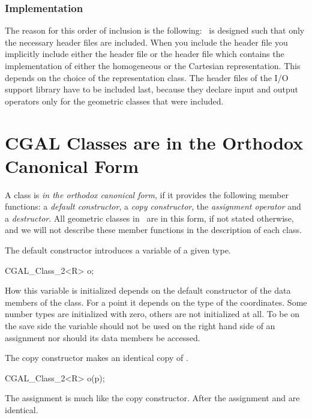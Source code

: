 \subsubsection*{Implementation}

The reason for this order of inclusion is the following: \cgal\ is designed
such that only the necessary header files are included. When you 
include the header file  you implicitly
include either the header file  or the header file
 which contains the implementation of either the 
homogeneous or the Cartesian representation. This depends on the choice
of the representation class. The header files of the I/O support library
have to be included last, because they declare input and output operators
only for the geometric classes that were included.


\section{CGAL Classes are in the Orthodox Canonical Form}

A class is {\em in the orthodox canonical form}, if it provides the
following member functions: a {\em default constructor}, a {\em copy
constructor}, the {\em assignment operator} and a {\em destructor}.
All geometric classes in \cgal\ are in this form, if not stated
otherwise, and we will 
not describe these member functions in the description of each class.

\smallskip
The default constructor introduces a variable of 
a given type. 

\begin{cprog}

  CGAL_Class_2<R> o;
\end{cprog}
%
How this variable is initialized depends on the default constructor
of the data members of the class. For a point it depends on the 
type of the coordinates. Some number types are initialized with zero,
others are not initialized at all. To be on the save side the variable
should not be used on the right hand side of an assignment nor
should its data members be accessed. 

\smallskip
The copy constructor makes an identical copy of .

\begin{cprog}

CGAL_Class_2<R> o(p);
\end{cprog} 

\smallskip
The assignment is much like the copy constructor. After
the assignment  and  are identical.

